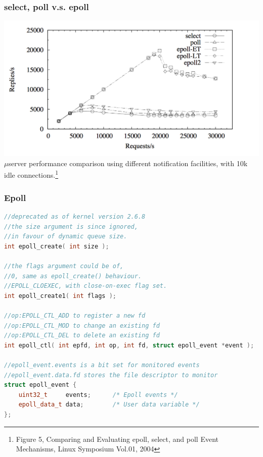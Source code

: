 \documentclass[aspectratio=43]{beamer}
\begin{document}
\begin{frame}[fragile]
  \frametitle{select, poll v.s. epoll}
  \begin{center}
  \includegraphics[scale=0.5]{select_poll_epoll_perf.png}\\
  {\tiny $\mu$server performance comparison using different notification facilities, with 10k idle connections.\footnote{\tiny Figure 5, Comparing and Evaluating epoll, select, and poll Event Mechanisms, Linux Symposium Vol.01, 2004}}
  \end{center}
\end{frame}

\begin{frame}[fragile]
  \frametitle{Epoll}
    \begin{lstlisting}[language=C++,basicstyle=\ttfamily\scriptsize,commentstyle=\color{commgreen},keywordstyle=\color{blue},breaklines=true]
//deprecated as of kernel version 2.6.8
//the size argument is since ignored,
//in favour of dynamic queue size.
int epoll_create( int size );

//the flags argument could be of,
//0, same as epoll_create() behaviour.
//EPOLL_CLOEXEC, with close-on-exec flag set.
int epoll_create1( int flags );

//op:EPOLL_CTL_ADD to register a new fd
//op:EPOLL_CTL_MOD to change an existing fd
//op:EPOLL_CTL_DEL to delete an existing fd
int epoll_ctl( int epfd, int op, int fd, struct epoll_event *event );

//epoll_event.events is a bit set for monitored events
//epoll_event.data.fd stores the file descriptor to monitor
struct epoll_event {
    uint32_t     events;      /* Epoll events */
    epoll_data_t data;        /* User data variable */
};

\end{lstlisting}
\end{frame}
\end{document}
